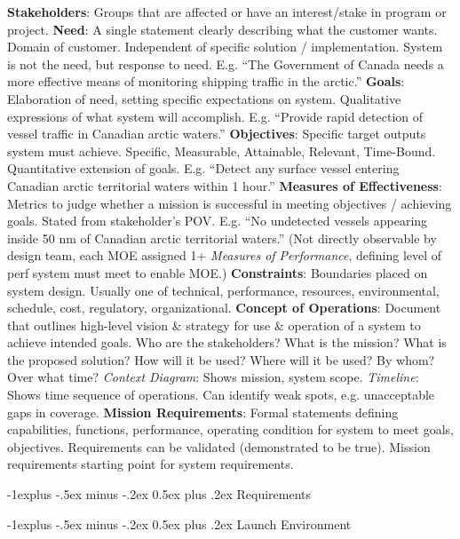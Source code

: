 \documentclass[letterpaper, 8pt]{extarticle}
\makeatletter
\renewcommand{\section}{\@startsection{section}{1}{0mm}%
                                {-1explus -.5ex minus -.2ex}%
                                {0.5ex plus .2ex}%
                                {\normalfont\normalsize\bfseries}}
\makeatother
\begin{document}
\begin{multicols*}{4}
\textbf{Stakeholders}:
Groups that are affected or have an interest/stake in program or project.
\textbf{Need}:
A single statement clearly describing what the customer wants.
Domain of customer. Independent of specific solution / implementation.
System is not the need, but response to need.
E.g. ``The Government of Canada needs a more effective means of monitoring shipping traffic in the arctic.''
\textbf{Goals}:
Elaboration of need, setting specific expectations on system.
Qualitative expressions of what system will accomplish.
E.g. ``Provide rapid detection of vessel traffic in Canadian arctic waters.''
\textbf{Objectives}:
Specific target outputs system must achieve.
Specific, Measurable, Attainable, Relevant, Time-Bound.
Quantitative extension of goals.
E.g. ``Detect any surface vessel entering Canadian arctic territorial waters within 1 hour.''
\textbf{Measures of Effectiveness}:
Metrics to judge whether a mission is successful in meeting objectives / achieving goals.
Stated from stakeholder's POV.
E.g. ``No undetected vessels appearing inside 50 nm of Canadian arctic territorial waters.''
(Not directly observable by design team, each MOE assigned 1+ \textit{Measures of Performance},
defining level of perf system must meet to enable MOE.)
\textbf{Constraints}:
Boundaries placed on system design. Usually one of
technical, performance, resources, environmental,
schedule, cost, regulatory, organizational.
\textbf{Concept of Operations}:
Document that outlines high-level vision \& strategy for use \& operation of a system to achieve intended goals.
Who are the stakeholders?
What is the mission?
What is the proposed solution?
How will it be used?
Where will it be used?
By whom?
Over what time?
\textit{Context Diagram}:
Shows mission, system scope.
\textit{Timeline}:
Shows time sequence of operations.
Can identify weak spots, e.g. unacceptable gaps in coverage.
\textbf{Mission Requirements}:
Formal statements defining capabilities, functions, performance, operating condition for system to meet goals, objectives.
Requirements can be validated (demonstrated to be true).
Mission requirements starting point for system requirements.

\section{Requirements}

\section{Launch Environment}


\end{multicols*}
\end{document}
